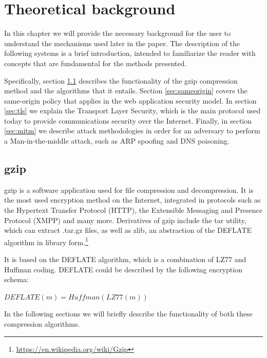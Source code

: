 \chapter{Theoretical background}\label{background}

In this chapter we will provide the necessary background for the user to understand the mechanisms used later in the paper. The description of the following systems is a brief introduction, intended to familiarize the reader with concepts that are fundamental for the methods presented.

Specifically, section \ref{sec:gzip} describes the functionality of the gzip compression method and the algorithms that it entails. Section \ref{sec:sameorigin} covers the same-origin policy that applies in the web application security model. In section \ref{sec:tls} we explain the Transport Layer Security, which is the main protocol used today to provide communications security over the Internet. Finally, in section \ref{sec:mitm} we describe attack methodologies in order for an adversary to perform a Man-in-the-middle attack, such as ARP spoofing and DNS poisoning.

\section{gzip}\label{sec:gzip}

gzip is a software application used for file compression and decompression. It is the most used encryption method on the Internet, integrated in protocols such as the Hypertext Transfer Protocol (HTTP), the Extensible Messaging and Presence Protocol (XMPP) and many more. Derivatives of gzip include the tar utility, which can extract .tar.gz files, as well as zlib, an abstraction of the DEFLATE algorithm in library form.\footnote{\url{https://en.wikipedia.org/wiki/Gzip}}

It is based on the DEFLATE algorithm, which is a combination of LZ77 and Huffman coding. DEFLATE could be described by the following encryption schema:

\begin{math}DEFLATE(m) = Huffman(LZ77(m))\end{math}

In the following sections we will briefly describe the functionality of both these compression algorithms.

